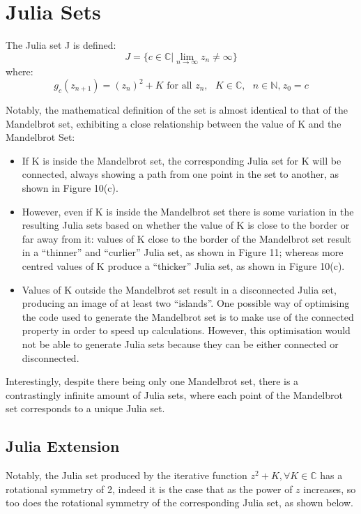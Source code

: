 \documentclass[a4paper]{article}
\begin{document}
\section{Julia Sets}

The Julia set J is defined:
\[J=\{c \in \mathbb{C} | \lim_{n \to \infty} z_{n} \neq \infty\}\]
where:
\begin{equation}
g_{c}(z_{n+1}) = (z_{n})^2 + K \mbox{ for all }  z_{n}, \mbox{ $K$} \in \mathbb{C}, \mbox{ $n$} \in \mathbb{N}, \hspace{1pt} z_{0} = c 
\end{equation}

Notably, the mathematical definition of the set is almost identical to that of the Mandelbrot set, exhibiting a close relationship between the value of K and the Mandelbrot Set: 

\begin{itemize}
\item If K is inside the Mandelbrot set, the corresponding Julia set for K will be connected, always showing a path from one point in the set to another, as shown in Figure 10(c). 

\item However, even if K is inside the Mandelbrot set there is some variation in the resulting Julia sets based on whether the value of K is close to the border or far away from it: values of K close to the border of the Mandelbrot set result in a “thinner” and “curlier” Julia set, as shown in Figure 11; whereas more centred values of K produce a “thicker” Julia set, as shown in Figure 10(c). 

\item Values of K outside the Mandelbrot set result in a disconnected Julia set, producing an image of at least two “islands”. One possible way of optimising the code used to generate the Mandelbrot set is to make use of the connected property in order to speed up calculations. However, this optimisation would not be able to generate Julia sets because they can be either connected or disconnected. 

\end{itemize}

\noindent Interestingly, despite there being only one Mandelbrot set, there is a contrastingly infinite amount of Julia sets, where each point of the Mandelbrot set corresponds to a unique Julia set.

\subsection{Julia Extension}
Notably, the Julia set produced by the iterative function $z^2 + K, \forall K \in \mathbb{C}$ has a rotational symmetry of 2, indeed it is the case that as the power of $z$ increases, so too does the rotational symmetry of the corresponding Julia set, as shown below.
\end{document}
